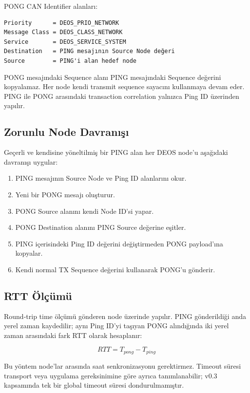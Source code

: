 \documentclass[a4paper,10pt]{article}
\begin{document}
PONG CAN Identifier alanları:

\begin{verbatim}
Priority      = DEOS_PRIO_NETWORK
Message Class = DEOS_CLASS_NETWORK
Service       = DEOS_SERVICE_SYSTEM
Destination   = PING mesajının Source Node değeri
Source        = PING'i alan hedef node
\end{verbatim}

PONG mesajındaki Sequence alanı PING mesajındaki Sequence değerini kopyalamaz. Her node
kendi transmit sequence sayacını kullanmaya devam eder. PING ile PONG arasındaki transaction
correlation yalnızca Ping ID üzerinden yapılır.

\subsection{Zorunlu Node Davranışı}

Geçerli ve kendisine yöneltilmiş bir PING alan her DEOS node'u aşağıdaki davranışı uygular:

\begin{enumerate}[nosep]
    \item PING mesajının Source Node ve Ping ID alanlarını okur.
    \item Yeni bir PONG mesajı oluşturur.
    \item PONG Source alanını kendi Node ID'si yapar.
    \item PONG Destination alanını PING Source değerine eşitler.
    \item PING içerisindeki Ping ID değerini değiştirmeden PONG payload'ına kopyalar.
    \item Kendi normal TX Sequence değerini kullanarak PONG'u gönderir.
\end{enumerate}

\subsection{RTT Ölçümü}

Round-trip time ölçümü gönderen node üzerinde yapılır. PING gönderildiği anda yerel zaman
kaydedilir; aynı Ping ID'yi taşıyan PONG alındığında iki yerel zaman arasındaki fark RTT
olarak hesaplanır:

\[
RTT = T_{pong} - T_{ping}
\]

Bu yöntem node'lar arasında saat senkronizasyonu gerektirmez. Timeout süresi transport veya
uygulama gereksinimine göre ayrıca tanımlanabilir; v0.3 kapsamında tek bir global timeout
süresi dondurulmamıştır.
\end{document}
